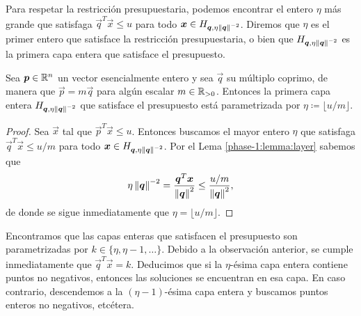 Para respetar la restricción presupuestaria, podemos encontrar el entero $\eta$ más grande que
satisfaga $\vec{q}^T\vec{x} \leq u$ para todo $\boldsymbol{x} \in H_{\boldsymbol{q}, \eta\left\lVert \boldsymbol{q} \right\rVert^{-2}}$.
Diremos que $\eta$ es el primer entero que satisface la restricción presupuestaria, o bien que
$H_{\boldsymbol{q}, \eta\left\lVert \boldsymbol{q} \right\rVert^{-2}}$ es la primera capa entera que satisface el presupuesto.
\begin{lemma}
	\label{phase-1:lemma:eta}
	Sea $\boldsymbol{p} \in \mathbb{R}^n$ un vector esencialmente entero y sea $\vec{q}$ su múltiplo coprimo, de
	manera que $\vec{p} = m\vec{q}$ para algún escalar $m \in \mathbb{R}_{>0}$. Entonces la primera capa
	entera $H_{\boldsymbol{q}, \eta \left\lVert \boldsymbol{q} \right\rVert^{-2}}$ que satisface el presupuesto está parametrizada
	por $\eta \coloneq \lfloor u/m \rfloor$.
\end{lemma}
\begin{proof}
	Sea $\vec{x}$ tal que $\vec{p}^T\vec{x} \leq u$. Entonces buscamos el mayor entero $\eta$ que
	satisfaga $\vec{q}^T\vec{x} \leq u/m$ para todo $\boldsymbol{x} \in H_{\boldsymbol{q},
	\eta\left\lVert \boldsymbol{q} \right\rVert^{-2}}$. Por el Lema \ref{phase-1:lemma:layer} sabemos que
	\begin{equation*}
		\eta\left\lVert \boldsymbol{q} \right\rVert^{-2} = \frac{\boldsymbol{q}^T\boldsymbol{x}}{\left\lVert \boldsymbol{q} \right\rVert^2} \leq
		\frac{u/m}{\left\lVert \boldsymbol{q} \right\rVert^2},
	\end{equation*}
	de donde se sigue inmediatamente que $\eta = \lfloor u/m \rfloor$.
\end{proof}

Encontramos que las capas enteras que satisfacen el presupuesto son parametrizadas por $k \in
\lbrace \eta, \eta - 1, \ldots \rbrace$. Debido a la observación anterior, se cumple inmediatamente
que $\vec{q}^T\vec{x} = k$. Deducimos que si la $\eta$-ésima capa entera contiene puntos no
negativos, entonces las soluciones se encuentran en esa capa. En caso contrario, descendemos a la
$(\eta - 1)$-ésima capa entera y buscamos puntos enteros no negativos, etcétera.

